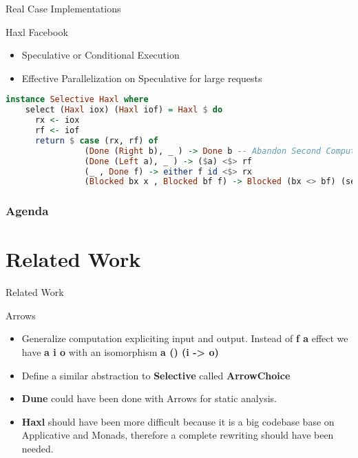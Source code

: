 \documentclass{beamer}
\begin{document}
\begin{frame}[fragile]{Real Case Implementations}

  \begin{block}{Haxl Facebook}
    \begin{itemize}
    \item Speculative or Conditional Execution 
    \item Effective Parallelization on Speculative for large requests 
    \end{itemize}
  \end{block}

\begin{lstlisting}[language=Haskell]
  instance Selective Haxl where
    select (Haxl iox) (Haxl iof) = Haxl $ do
      rx <- iox
      rf <- iof
      return $ case (rx, rf) of
                (Done (Right b), _ ) -> Done b -- Abandon Second Computation
                (Done (Left a), _ ) -> ($a) <$> rf
                (_ , Done f) -> either f id <$> rx
                (Blocked bx x , Blocked bf f) -> Blocked (bx <> bf) (select x f)-- Selective execution
\end{lstlisting}
\end{frame}

\begin{frame}
  \frametitle{Agenda}
  \section{Related Work}
  \tableofcontents[currentsection]
\end{frame}

\begin{frame}[fragile]{Related Work}
  \begin{block}{Arrows}
    \begin{itemize}
    \item Generalize computation expliciting input and output. Instead of
      \textbf{f a} effect we have \textbf{a i o} with an isomorphism \textbf{a () (i -> o)}
    \item Define a similar abstraction to \textbf{Selective} called \textbf{ArrowChoice}
    \item \textbf{Dune} could have been done with Arrows for static analysis.
    \item \textbf{Haxl} should have been more difficult because it is a big
      codebase base on Applicative and Monads, therefore a complete rewriting
      should have been needed. 
    \end{itemize}
  \end{block}
\end{frame}
  
\end{document}
